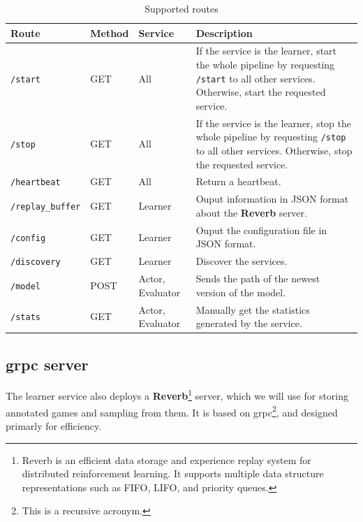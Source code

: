 \begin{table}[h]
	\begin{tabularx}{\textwidth}{| p{3cm} | p{1.2cm} | p{1.7cm} | X |}
		\hline
		Route & Method & Service & Description \\
		\hline 
		\texttt{/start} &  GET & All & If the service is the learner, start the whole pipeline by requesting \texttt{/start} to all other services. Otherwise, start the requested service. \\
		\hline
		\texttt{/stop} &  GET & All & If the service is the learner, stop the whole pipeline by requesting \texttt{/stop} to all other services. Otherwise, stop the requested service. \\
		\hline
		\texttt{/heartbeat} & GET & All & Return a heartbeat. \\
		\hline
		\texttt{/replay\_buffer} & GET & Learner & Ouput information in JSON format about the \newline \textbf{Reverb} server. \\
		\hline
		\texttt{/config} & GET & Learner & Ouput the configuration file in JSON format. \\
		\hline
		\texttt{/discovery} & GET & Learner & Discover the services. \\
		\hline
		\texttt{/model} & POST & Actor, Evaluator & Sends the path of the newest version of the model. \\
		\hline
		\texttt{/stats} & GET & Actor, Evaluator & Manually get the statistics generated by the service.\\
		\hline
	\end{tabularx}
	\caption{Supported routes
		\label{table:ImplementedRoutes}}
\end{table}

\subsection{\acrshort{grpc} server}
The learner service also deploys a \textbf{Reverb}\footnote{Reverb is an efficient data storage and experience replay system for distributed reinforcement learning. It supports multiple data structure representations such as FIFO, LIFO, and priority queues. } server, which we will use for storing annotated games and sampling from them. It is based on \acrfull{grpc}\footnote{This is a recursive acronym.}, and designed primarly for efficiency. 


